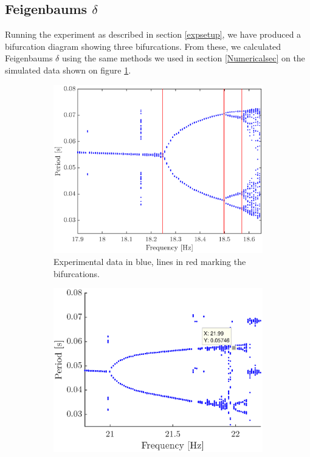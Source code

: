\documentclass[12pt,oneside,a4paper]{article}
\numberwithin{equation}{section}
\begin{document}
{{{{\subsection{Feigenbaums $\delta$}
Running the experiment as described in section \ref{expsetup}, we have produced a bifurcation diagram showing three bifurcations. From these, we calculated Feigenbaums $\delta$ using the same methods we used in section \ref{Numericalsec} on the simulated data shown on figure \ref{expfeigplot}.
\begin{figure}[h]
\centering
\begin{subfigure}[t]{0.49\textwidth}
\centering
\includegraphics[width=\textwidth]{feigplotexp}
\caption{Experimental data in blue, lines in red marking the bifurcations.}
\label{expfeigplot}
\end{subfigure} \hfill
\begin{subfigure}[t]{0.49\textwidth}
\centering
\includegraphics[width=\textwidth]{long}

\end{subfigure}
\end{figure}}}}}
\end{document}
